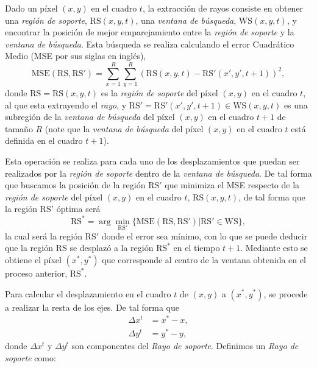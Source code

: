 	Dado un píxel $(x,y)$ en el cuadro $t$, la extracción de rayos consiste en obtener una \textit{región de soporte}, $\text{RS}(x,y,t)$, una \textit{ventana de búsqueda}, $\text{WS}(x,y,t)$, y encontrar la posición de mejor emparejamiento entre la \textit{región de soporte} y la \textit{ventana de búsqueda}. Esta búsqueda se realiza calculando el error Cuadrático Medio (MSE por sus siglas en inglés), \begin{equation}\label{algoritmo:eq:mse}	
			\text{MSE}(\text{RS}, \text{RS}') = \sum_{x=1}^{R} \sum_{y=1}^{R} \left(\text{RS}(x,y,t) - \text{RS}'(x',y', t+1)\right)^2,
		\end{equation} 
	donde $\text{RS} = \text{RS}(x,y,t)$ es la \textit{región de soporte} del píxel $(x,y)$ en el cuadro $t$, al que esta extrayendo el \textit{rayo}, y $\text{RS}' = \text{RS}'(x',y',t+1) \in \text{WS}(x,y,t)$ es una subregión de la \textit{ventana de búsqueda} del píxel $(x,y)$ en el cuadro $t+1$ de tamaño $R$ (note que la \textit{ventana de búsqueda} del píxel $(x,y)$ en el cuadro $t$ está definida en el cuadro $t+1$).
		
	Esta operación se realiza para cada uno de los desplazamientos que puedan ser realizados por la \textit{región de soporte} dentro de la \textit{ventana de búsqueda}. De tal forma que buscamos la posición de la región $\text{RS}'$ que minimiza el MSE respecto de la \textit{región de soporte} del píxel $(x,y)$ en el cuadro $t$, $\text{RS}(x,y,t)$, de tal forma que la región $\text{RS}'$ óptima será
	\begin{equation}
		\text{RS}^* = \arg \min_{\text{RS}'}\{\text{MSE}(\text{RS},\text{RS}') | \text{RS}' \in \text{WS} \},
	\end{equation}		
	 la cual será la región $\text{RS}'$ donde el error sea mínimo, con lo que se puede deducir que la región $\text{RS}$ se desplazó a la región $\text{RS}^*$ en el tiempo $t+1$. Mediante esto se obtiene el píxel $(x^*,y^*)$ que corresponde al centro de la ventana obtenida en el proceso anterior, $\text{RS}^*$.
	
	Para calcular el desplazamiento en el cuadro $t$ de $(x,y)$ a $(x^*,y^*)$, se procede a realizar la resta de los ejes. De tal forma que
	\begin{align}
		\Delta x^{t} &= x^*-x,\\ 
		\Delta y^{t} &= y^*-y,
	\end{align}
		donde $ \Delta x^t$ y $ \Delta y^t$ son componentes del \textit{Rayo de soporte}. Definimos un \textit{Rayo de soporte} como:
	
